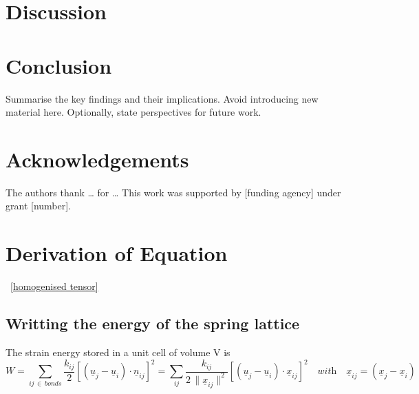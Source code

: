 \documentclass[10pt, onecolumn]{article}
\begin{document}
\section{Discussion}
\label{sec:discussion}



\section{Conclusion}
\label{sec:conclusion}

Summarise the key findings and their implications. Avoid introducing new
material here. Optionally, state perspectives for future work.



\section*{Acknowledgements}

The authors thank \ldots{} for \ldots{}
This work was supported by [funding agency] under grant [number].

\appendix
\section{Derivation of Equation}~\eqref{homogenised tensor}
\subsection{Writting the energy of the spring lattice}
The strain energy stored in a unit cell of volume V is
\begin{equation}
W = \sum_{ij \, \in \, bonds} \frac{k_{ij}}{2}\left[(\underline{u}_j - \underline{u}_i)\cdot \underline{n}_{ij}\right]^2
= \sum_{ij} \frac{k_{ij}}{2\,\|\underline{x}_{ij}\|^2}\left[(\underline{u}_j - \underline{u}_i)\cdot \underline{x}_{ij}\right]^2  \quad \textit{with} \quad \underline{x}_{ij} = (\underline{x}_{j} - \underline{x}_{i})
\label{demo1}
\end{equation}
\end{document}
